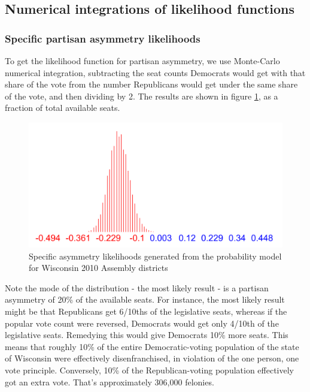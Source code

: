 \documentclass[preprint,12pt]{article}
\begin{document}
\subsection{Numerical integrations of likelihood functions}

\subsubsection{Specific partisan asymmetry likelihoods}
 
To get the likelihood function for partisan asymmetry, we use Monte-Carlo numerical integration, subtracting the seat counts Democrats would get with that share of the vote from the number Republicans would get under the same share of the vote, and then dividing by 2. The results are shown in figure \ref{fig:LikelihoodsAsymmetry}, as a fraction of total available seats.
 
\begin{figure}[htb!]
    \begin{center}
        \includegraphics[scale=0.5]{../Figures/WI2010/asymmetry_alt.png}
        \caption{Specific asymmetry likelihoods generated from the probability model for Wisconsin 2010 Assembly districts}\label{fig:LikelihoodsAsymmetry}
    \end{center}
\end{figure}
 
Note the mode of the distribution - the most likely result - is a partisan asymmetry of 20\% of the available seats.  For instance, the most likely result might be that Republicans get 6/10ths of the legislative seats, whereas if the popular vote count were reversed, Democrats would get only 4/10th of the legislative seats.  Remedying this would give Democrats 10\% more seats.  This means that roughly 10\% of the entire Democratic-voting population of the state of Wisconsin were effectively disenfranchised, in violation of the one person, one vote principle.  Conversely, 10\% of the Republican-voting population effectively got an extra vote.  That's approximately 306,000 felonies.
 
\end{document}
